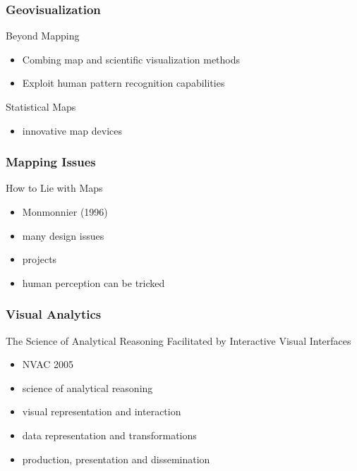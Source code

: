 \documentclass[nototal,handout]{beamer}
\begin{document}
\begin{frame}
	\frametitle{Geovisualization}
 
\begin{block}{Beyond Mapping}
 \begin{itemize}
 \item  Combing map and scientific visualization methods
 \item  Exploit human pattern recognition capabilities
 \end{itemize}
 \end{block} 
\begin{block}{Statistical Maps}
 \begin{itemize}
 \item  innovative map devices
 \end{itemize}
 \end{block} \end{frame} 

\begin{frame}
	\frametitle{Mapping Issues}
 
\begin{block}{How to Lie with Maps}
 \begin{itemize}
 \item  Monmonnier (1996)
 \item  many design issues
 \item  projects
 \item  human perception can be tricked
 \end{itemize}
 \end{block} \end{frame} 

\begin{frame}
	\frametitle{Visual Analytics}
 
\begin{block}{The Science of Analytical Reasoning Facilitated by Interactive Visual Interfaces}
 \begin{itemize}
 \item  NVAC 2005
 \item  science of analytical reasoning
 \item  visual representation and interaction
 \item  data representation and transformations
 \item  production, presentation and dissemination
 \end{itemize}
 \end{block} \end{frame} 
\end{document}
